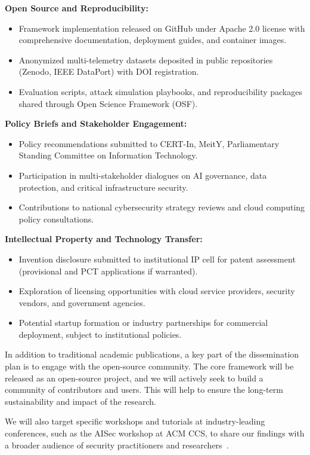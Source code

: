 \textbf{Open Source and Reproducibility:}
\begin{itemize}
    \item Framework implementation released on GitHub under Apache 2.0 license with comprehensive documentation, deployment guides, and container images.
    \item Anonymized multi-telemetry datasets deposited in public repositories (Zenodo, IEEE DataPort) with DOI registration.
    \item Evaluation scripts, attack simulation playbooks, and reproducibility packages shared through Open Science Framework (OSF).
\end{itemize}

\textbf{Policy Briefs and Stakeholder Engagement:}
\begin{itemize}
    \item Policy recommendations submitted to CERT-In, MeitY, Parliamentary Standing Committee on Information Technology.
    \item Participation in multi-stakeholder dialogues on AI governance, data protection, and critical infrastructure security.
    \item Contributions to national cybersecurity strategy reviews and cloud computing policy consultations.
\end{itemize}

\textbf{Intellectual Property and Technology Transfer:}
\begin{itemize}
    \item Invention disclosure submitted to institutional IP cell for patent assessment (provisional and PCT applications if warranted).
    \item Exploration of licensing opportunities with cloud service providers, security vendors, and government agencies.
    \item Potential startup formation or industry partnerships for commercial deployment, subject to institutional policies.
\end{itemize}

In addition to traditional academic publications, a key part of the dissemination plan is to engage with the open-source community. The core framework will be released as an open-source project, and we will actively seek to build a community of contributors and users. This will help to ensure the long-term sustainability and impact of the research.

We will also target specific workshops and tutorials at industry-leading conferences, such as the AISec workshop at ACM CCS, to share our findings with a broader audience of security practitioners and researchers~\cite{aisec_workshop_2023}.

